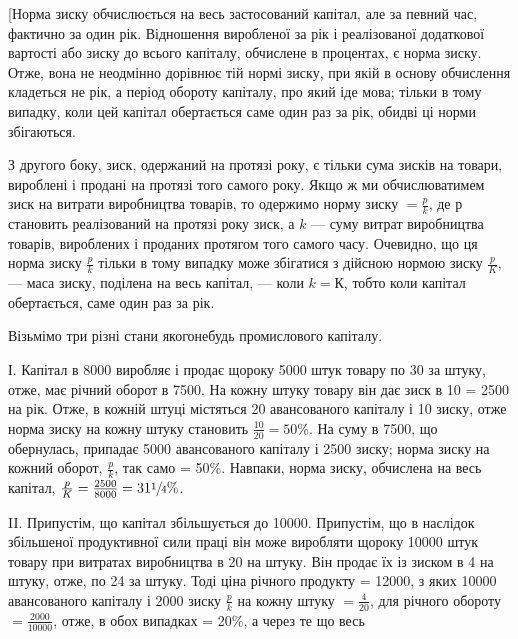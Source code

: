 
[Норма зиску обчислюється на весь застосований капітал, але за певний час, фактично за один рік.
Відношення виробленої за рік і реалізованої додаткової вартості або зиску до всього капіталу,
обчислене в процентах, є норма зиску. Отже, вона не неодмінно дорівнює тій нормі зиску, при якій в
основу обчислення кладеться не рік, а період обороту капіталу, про який іде мова; тільки в тому
випадку, коли цей капітал обертається саме один раз за рік, обидві ці норми збігаються.

З другого боку, зиск, одержаний на протязі року, є тільки сума зисків на товари, вироблені і продані
на протязі того самого року. Якщо ж ми обчислюватимем зиск на витрати виробництва товарів, то
одержимо норму зиску $= \frac{p}{k}$, де $р$ становить реалізований на протязі року зиск, а $k$ — суму витрат
виробництва товарів, вироблених і проданих протягом того самого часу. Очевидно, що ця норма зиску
$\frac{p}{k}$ тільки в тому випадку може збігатися з дійсною нормою зиску $\frac{p}{K}$, — маса зиску, поділена на весь
капітал, — коли $k = К$, тобто коли капітал обертається, саме один раз за рік.

Візьмімо три різні стани якогонебудь промислового капіталу.

І. Капітал в 8000 виробляє і продає щороку 5000 штук товару по 30 за
штуку, отже, має річний оборот в 7500. На кожну штуку товару
він дає зиск в 10 = 2500 на рік. Отже, в кожній штуці містяться 20 авансованого капіталу і 10 зиску, отже норма зиску на кожну штуку становить
$\frac{10}{20}= 50\%$. На суму в 7500, що обернулась, припадає 5000
авансованого капіталу і 2500 зиску; норма зиску на кожний оборот, $\frac{p}{k}$, так само =
50\%. Навпаки, норма зиску, обчислена на весь капітал, $\frac{p}{K} = \frac{2500}{8000} = 31\sfrac{1}{4}\%$.

II. Припустім, що капітал збільшується до \num{10000}. Припустім, що в наслідок
збільшеної продуктивної сили праці він може виробляти щороку \num{10000} штук товару при витратах
виробництва в 20 на штуку. Він продає їх із зиском в 4 на штуку, отже, по 24 за штуку. Тоді ціна річного продукту = \num{12000}, з яких \num{10000} авансованого капіталу і 2000 зиску $\frac{p}{k}$ на кожну штуку $= \frac{4}{20}$, для річного
обороту $= \frac{2000}{\num{10000}}$, отже, в обох випадках = 20\%, а через те що весь
\parbreak{}  %
